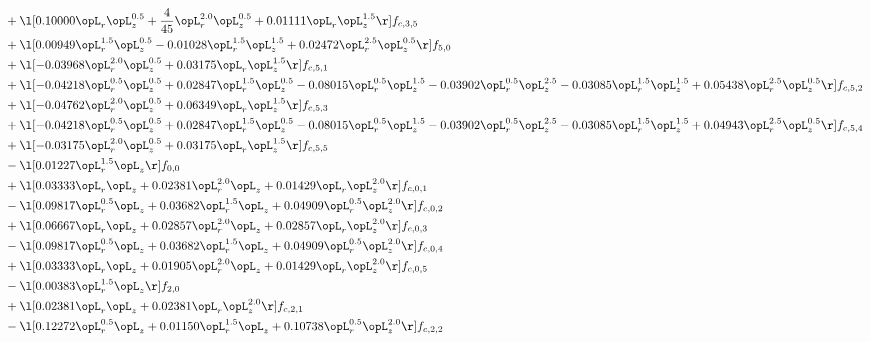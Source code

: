 \begin{alignat}{2}
& + \l[  0.10000 \opL_r \opL_z^{0.5} + \frac{4}{45} \opL_r^{2.0} \opL_z^{0.5} +  0.01111 \opL_r \opL_z^{1.5}  \r] f_{c,3,5} \nonumber \\ 
& + \l[  0.00949 \opL_r^{1.5} \opL_z^{0.5}   -0.01028 \opL_r^{1.5} \opL_z^{1.5} +  0.02472 \opL_r^{2.5} \opL_z^{0.5}  \r] f_{5,0} \nonumber \\ 
& + \l[  -0.03968 \opL_r^{2.0} \opL_z^{0.5} +  0.03175 \opL_r \opL_z^{1.5}  \r] f_{c,5,1} \nonumber \\ 
& + \l[  -0.04218 \opL_r^{0.5} \opL_z^{0.5} +  0.02847 \opL_r^{1.5} \opL_z^{0.5}   -0.08015 \opL_r^{0.5} \opL_z^{1.5}   -0.03902 \opL_r^{0.5} \opL_z^{2.5}   -0.03085 \opL_r^{1.5} \opL_z^{1.5} +  0.05438 \opL_r^{2.5} \opL_z^{0.5}  \r] f_{c,5,2} \nonumber \\ 
& + \l[  -0.04762 \opL_r^{2.0} \opL_z^{0.5} +  0.06349 \opL_r \opL_z^{1.5}  \r] f_{c,5,3} \nonumber \\ 
& + \l[  -0.04218 \opL_r^{0.5} \opL_z^{0.5} +  0.02847 \opL_r^{1.5} \opL_z^{0.5}   -0.08015 \opL_r^{0.5} \opL_z^{1.5}   -0.03902 \opL_r^{0.5} \opL_z^{2.5}   -0.03085 \opL_r^{1.5} \opL_z^{1.5} +  0.04943 \opL_r^{2.5} \opL_z^{0.5}  \r] f_{c,5,4} \nonumber \\ 
& + \l[  -0.03175 \opL_r^{2.0} \opL_z^{0.5} +  0.03175 \opL_r \opL_z^{1.5}  \r] f_{c,5,5} \nonumber \\ 
& - \l[  0.01227 \opL_r^{1.5} \opL_z  \r] f_{0,0} \nonumber \\ 
& + \l[  0.03333 \opL_r \opL_z +  0.02381 \opL_r^{2.0} \opL_z +  0.01429 \opL_r \opL_z^{2.0}  \r] f_{c,0,1} \nonumber \\ 
& - \l[  0.09817 \opL_r^{0.5} \opL_z +  0.03682 \opL_r^{1.5} \opL_z +  0.04909 \opL_r^{0.5} \opL_z^{2.0}  \r] f_{c,0,2} \nonumber \\ 
& + \l[  0.06667 \opL_r \opL_z +  0.02857 \opL_r^{2.0} \opL_z +  0.02857 \opL_r \opL_z^{2.0}  \r] f_{c,0,3} \nonumber \\ 
& - \l[  0.09817 \opL_r^{0.5} \opL_z +  0.03682 \opL_r^{1.5} \opL_z +  0.04909 \opL_r^{0.5} \opL_z^{2.0}  \r] f_{c,0,4} \nonumber \\ 
& + \l[  0.03333 \opL_r \opL_z +  0.01905 \opL_r^{2.0} \opL_z +  0.01429 \opL_r \opL_z^{2.0}  \r] f_{c,0,5} \nonumber \\ 
& - \l[  0.00383 \opL_r^{1.5} \opL_z  \r] f_{2,0} \nonumber \\ 
& + \l[  0.02381 \opL_r \opL_z +  0.02381 \opL_r \opL_z^{2.0}  \r] f_{c,2,1} \nonumber \\ 
& - \l[  0.12272 \opL_r^{0.5} \opL_z +  0.01150 \opL_r^{1.5} \opL_z +  0.10738 \opL_r^{0.5} \opL_z^{2.0}  \r] f_{c,2,2} \nonumber \\ 

\end{alignat}
